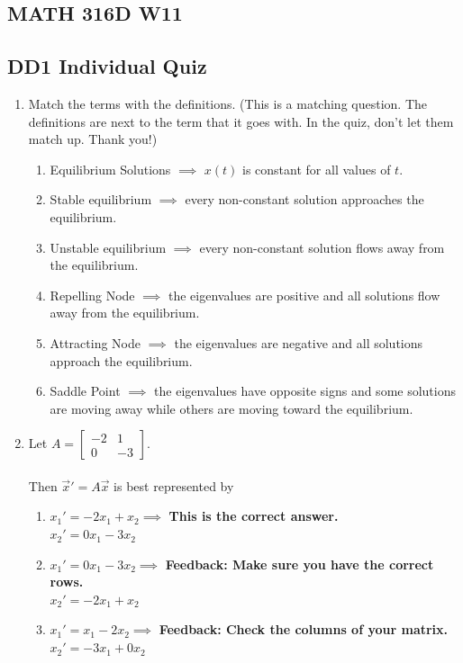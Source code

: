 \documentclass[11pt]{article}
\begin{document}
	
\begin{center}\section*{MATH 316D W11}\end{center}
\subsection*{DD1 Individual Quiz}
\begin{enumerate}
	\item Match the terms with the definitions. (This is a matching question. The definitions are next to the term that it goes with. In the quiz, don't let them match up. Thank you!)
	\begin{enumerate}
		\item Equilibrium Solutions $\implies$ $x(t)$ is constant for all values of $t$. 
		\item Stable equilibrium $\implies$ every non-constant solution approaches the equilibrium. 
		\item Unstable equilibrium $\implies$ every non-constant solution flows away from the equilibrium. 
		\item Repelling Node $\implies$ the eigenvalues are positive and all solutions flow away from the equilibrium. 
		\item Attracting Node $\implies$ the eigenvalues are negative and all solutions approach the equilibrium.  
		\item Saddle Point $\implies$ the eigenvalues have opposite signs and some solutions are moving away while others are moving toward the equilibrium. 
	\end{enumerate}
	\item Let $A = \begin{bmatrix}
	-2&1\\0&-3
	\end{bmatrix}$. \\\\Then $\vec{x}' = A\vec{x}$ is best represented by 
	\begin{enumerate}
		\item $x_1' = -2x_1 + x_2$$\implies$ \textbf{This is the correct answer.} \\$x_2' = 0x_1-3x_2$ 
		\item $x_1' = 0x_1-3x_2$$\implies$ \textbf{Feedback: Make sure you have the correct rows.}\\$x_2' = -2x_1+x_2$
		\item $x_1' = x_1-2x_2$$\implies$ \textbf{Feedback: Check the columns of your matrix.}\\$x_2' = -3x_1+0x_2$
$$
\end{enumerate}
\end{enumerate}
\end{document}
